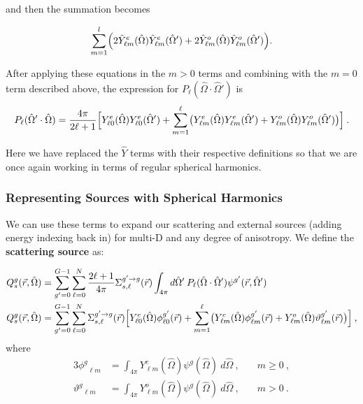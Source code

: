 \documentclass[12pt]{article}
\newcommand{\Macro}{\ensuremath{\Sigma}}
\newcommand{\vecr}{\ensuremath{\vec{r}}}
\newcommand{\vOmega}{\ensuremath{\hat{\Omega}}}
\newcommand{\even}{\ensuremath{\phi^g}}
\newcommand{\odd}{\ensuremath{\vartheta^g}}
\newcommand{\evenp}{\ensuremath{\phi^{g'}}}
\newcommand{\oddp}{\ensuremath{\vartheta^{g'}}}
\newcommand{\sigg}[1]{\ensuremath{\Macro^{g'\rightarrow g}_{s,#1}}}
\begin{document}
and then the summation becomes

\begin{equation}
  \sum_{m=1}^l\Bigl(
  2\hat{Y}^e_{\ell m}(\vOmega)\hat{Y}^e_{\ell m}(\vOmega') +
  2\hat{Y}^o_{\ell m}(\vOmega)\hat{Y}^o_{\ell m}(\vOmega')\Bigr).
\end{equation}

After applying these equations in the $m>0$ terms and combining with the $m=0$
term described above, the expression for $P_\ell(\vOmega\cdot\vOmega')$ is
\begin{equation}
  P_\ell(\vOmega'\cdot\vOmega) = \frac{4\pi}{2\ell+1}
  \Bigl[
  Y^e_{\ell0}(\vOmega)Y^e_{\ell0}(\vOmega') +
  \sum_{m=1}^\ell
  \bigl(Y^e_{\ell m}(\vOmega)Y^e_{\ell m}(\vOmega') +
  Y^o_{\ell m}(\vOmega)Y^o_{\ell m}(\vOmega')\bigr)\Bigr]\:.
    \label{eq:P_l(mu_o)}
\end{equation}

Here we have replaced the $\hat{Y}$ terms with their respective definitions
so that we are once again working in terms of regular spherical harmonics.

\subsubsection*{Representing Sources with Spherical Harmonics}

We can use these terms to expand our scattering and external sources (adding 
energy indexing back in) for multi-D and any degree of anisotropy. We define
the \textbf{scattering source} as:

\begin{align}
Q^g_{s}(\vec{r},\vOmega) &=
\sum_{g'=0}^{G-1} \sum_{\ell=0}^{N} \frac{2\ell+1}{4 \pi} \Sigma^{g'\rightarrow g}_{s,\ell}(\vecr)
\int_{4\pi} d\vOmega'\: P_\ell(\vOmega \cdot \vOmega') \psi^{g'}(\vecr, \vOmega')\\
  Q^g_{s}(\vec{r},\vOmega) &= \sum_{g'=0}^{G-1}
  \sum_{\ell=0}^N
  \sigg{\ell}(\vec{r})
  \Bigl[
  Y^e_{\ell0}(\vOmega)\evenp_{\ell0}(\vec{r}) +
  \sum_{m=1}^\ell
  \bigl(
  Y^e_{\ell m}(\vOmega)\evenp_{\ell m}(\vec{r}) +
  Y^o_{\ell m}(\vOmega)\oddp_{\ell m}(\vec{r})
  \bigr)\Bigr]\:,
  \label{eq:mg-scattering-source}
\end{align}
where
\begin{alignat}{3}
  \even_{\ell m} &= \int_{4\pi}Y^e_{\ell m}(\vOmega)\psi^g(\vOmega)\:d\vOmega\:,
  \quad& m\ge 0\:,\label{eq:even-flux}\\
  \odd_{\ell m} &= \int_{4\pi}Y^o_{\ell m}(\vOmega)\psi^g(\vOmega)\:d\vOmega\:,
  \quad& m>0\:.\label{eq:odd-flux}
\end{alignat}
\end{document}
